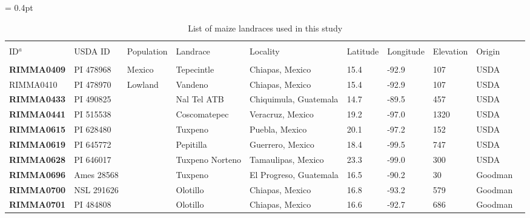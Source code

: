 \newpage


\doublerulesep = 0.4pt

\renewcommand{\thefigure}{S\arabic{figure}}
\renewcommand{\thetable}{S\arabic{table}}


\renewcommand{\arraystretch}{1.2}

\begin{table}[h]
    \begin{center}
    \caption[]{List of maize landraces used in this study\hspace*{9.1cm}}  
{\fontsize{7}{10}\selectfont
    \begin{tabular}{llllllllll}
        \hline\hline
       & & & \\[-4mm] 
	 ID$^a$	&	USDA ID	&	Population	&	Landrace	&	Locality	&	Latitude	&	Longitude	&	Elevation	&	Origin	\\[0.0cm]
	\hline 
	& & & \\[-4mm] 
{\bf RIMMA0409}	&	PI 478968	&	Mexico 	&	Tepecintle	&	Chiapas, Mexico	&	15.4 	&	-92.9 	&	107	&	USDA	\\
RIMMA0410	&	PI 478970	&	Lowland	&	Vandeno	&	Chiapas, Mexico	&	15.4 	&	-92.9 	&	107	&	USDA	\\
{\bf RIMMA0433}	&	PI 490825	&		&	Nal Tel ATB	&	Chiquimula, Guatemala	&	14.7 	&	-89.5 	&	457	&	USDA	\\
{\bf RIMMA0441}	&	PI 515538	&		&	Coscomatepec	&	Veracruz, Mexico	&	19.2 	&	-97.0 	&	1320	&	USDA	\\
{\bf RIMMA0615}	&	PI 628480	&		&	Tuxpeno	&	Puebla, Mexico	&	20.1 	&	-97.2 	&	152	&	USDA	\\
{\bf RIMMA0619}	&	PI 645772	&		&	Pepitilla	&	Guerrero, Mexico	&	18.4 	&	-99.5 	&	747	&	USDA	\\
{\bf RIMMA0628}	&	PI 646017	&		&	Tuxpeno Norteno	&	Tamaulipas, Mexico	&	23.3 	&	-99.0 	&	300	&	USDA	\\
{\bf RIMMA0696}	&	Ames 28568	&		&	Tuxpeno	&	El Progreso, Guatemala	&	16.5 	&	-90.2 	&	30	&	Goodman	\\
{\bf RIMMA0700}	&	NSL 291626	&		&	Olotillo	&	Chiapas, Mexico	&	16.8 	&	-93.2 	&	579	&	Goodman	\\
{\bf RIMMA0701}	&	PI 484808	&		&	Olotillo	&	Chiapas, Mexico	&	16.6 	&	-92.7 	&	686	&	Goodman	\\

\end{tabular}}
\end{center}
\end{table}
